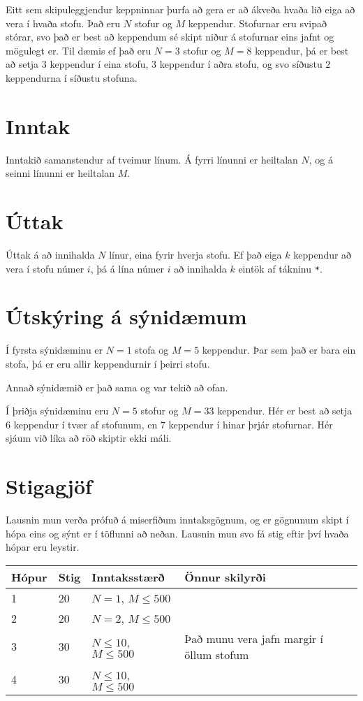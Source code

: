 

Eitt sem skipuleggjendur keppninnar þurfa að gera er að ákveða hvaða lið eiga að vera í hvaða stofu. Það eru $N$ stofur og $M$ keppendur. Stofurnar eru svipað stórar, svo það er best að keppendum sé skipt niður á stofurnar eins jafnt og mögulegt er. Til dæmis ef það eru $N=3$ stofur og $M=8$ keppendur, þá er best að setja $3$ keppendur í eina stofu, $3$ keppendur í aðra stofu, og svo síðustu $2$ keppendurna í síðustu stofuna.

\section*{Inntak}
Inntakið samanstendur af tveimur línum. Á fyrri línunni er heiltalan $N$, og á seinni línunni er heiltalan $M$.

\section*{Úttak}
Úttak á að innihalda $N$ línur, eina fyrir hverja stofu. Ef það eiga $k$ keppendur að vera í stofu númer $i$, þá á lína númer $i$ að innihalda $k$ eintök af tákninu \texttt{*}.

\section*{Útskýring á sýnidæmum}
Í fyrsta sýnidæminu er $N=1$ stofa og $M=5$ keppendur. Þar sem það er bara ein stofa, þá er eru allir keppendurnir í þeirri stofu.

Annað sýnidæmið er það sama og var tekið að ofan.

Í þriðja sýnidæminu eru $N=5$ stofur og $M=33$ keppendur. Hér er best að setja $6$ keppendur í tvær af stofunum, en $7$ keppendur í hinar þrjár stofurnar. Hér sjáum við líka að röð skiptir ekki máli. 

\section*{Stigagjöf}
Lausnin mun verða prófuð á miserfiðum inntaksgögnum, og er gögnunum skipt í
hópa eins og sýnt er í töflunni að neðan. Lausnin mun svo fá stig eftir því
hvaða hópar eru leystir.

\begin{tabular}{|l|l|l|l|}
\hline
Hópur & Stig & Inntaksstærð & Önnur skilyrði \\ \hline
1 & 20 & $N = 1$, $M \leq 500$ & \\ \hline
2 & 20 & $N = 2$, $M \leq 500$ & \\ \hline
3 & 30 & $N \leq 10$, $M \leq 500$ & Það munu vera jafn margir í öllum stofum \\ \hline
4 & 30 & $N \leq 10$, $M \leq 500$ & \\ \hline
\end{tabular}
